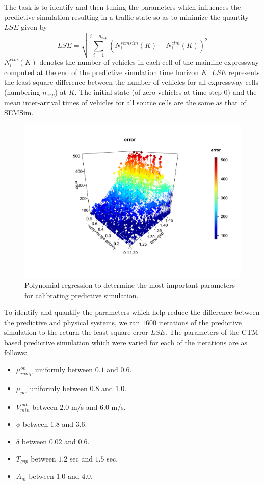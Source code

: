 \documentclass{wscpaperproc}
\theoremstyle{wsc}
\begin{document}
The task is to identify and then tuning the parameters which influences the predictive simulation resulting in a traffic state so as to minimize the quantity $LSE$ given by
\begin{equation}
LSE=\sqrt{\sum\limits_{i=1}^{i=n_{exp}}(N_i^{semsim}(K)-N_i^{ctm}(K))^2}
\end{equation}
$N_i^{ctm}(K)$ denotes the number of vehicles in each cell of the mainline expressway computed at the end of the predictive simulation time horizon $K$. $LSE$ represents the least square difference between the number of vehicles for all expressway cells (numbering $n_{exp}$) at $K$. The initial state (of zero vehicles at time-step $0$) and the mean inter-arrival times of vehicles for all source cells are the same as that of SEMSim.

\begin{figure}[!htbp]
    \centering
    \includegraphics[scale=0.50]{images/tuning-parameters-ctm.pdf}

    \caption{Polynomial regression to determine the most important parameters for calibrating predictive simulation.}
    \label{fig:var-important}
  \end{figure}

To identify and quantify the parameters which help reduce the difference between the predictive and physical systems, we ran $1600$ iterations of the predictive simulation to the return the least square error $LSE$. The parameters of the CTM based predictive simulation which were varied for each of the iterations are as follows:
\begin{itemize}
\item $\mu^{on}_{ramp}$ uniformly between $0.1$ and $0.6$.
\item $\mu_{pie}$ uniformly between $0.8$ and $1.0$.
\item $V_{min}^{out}$ between $2.0$ m/s  and $6.0$ m/s. 
\item $\phi$ between $1.8$ and $3.6$.
\item $\delta$ between $0.02$ and $0.6$.
\item $T_{gap}$ between $1.2$ sec and $1.5$ sec.
\item $A_m$ between $1.0$ and $4.0$.
\end{itemize}
\end{document}
